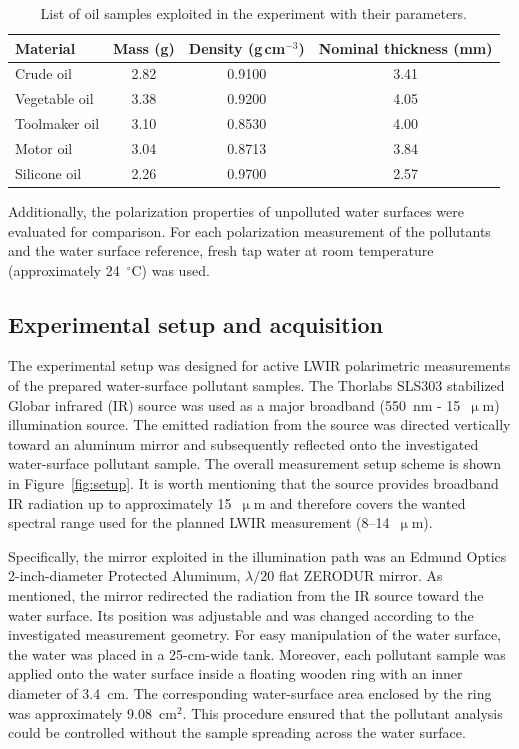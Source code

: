 \documentclass[pdflatex,sn-apa]{sn-jnl}
\begin{document}
\begin{table}[t]
\centering
\caption{List of oil samples exploited in the experiment with their parameters.}
\label{tab:oil_samples}
\begin{tabular}{lccc}
\toprule
Material & Mass (g) & Density (g\,cm$^{-3}$) & Nominal thickness (mm) \\
\midrule
Crude oil     & 2.82 & 0.9100 & 3.41 \\
Vegetable oil & 3.38 & 0.9200 & 4.05 \\
Toolmaker oil & 3.10 & 0.8530 & 4.00 \\
Motor oil     & 3.04 & 0.8713 & 3.84 \\
Silicone oil  & 2.26 & 0.9700 & 2.57 \\
\bottomrule
\end{tabular}
\end{table}

Additionally, the polarization properties of unpolluted water surfaces were evaluated for comparison. For each polarization measurement of the pollutants and the water surface reference, fresh tap water at room temperature (approximately 24~$^\circ$C) was used. 




\subsection{Experimental setup and acquisition}

The experimental setup was designed for active LWIR polarimetric measurements of the prepared water-surface pollutant samples. The Thorlabs SLS303 stabilized Globar infrared (IR) source was used as a major broadband (550~nm - 15~$\upmu$m) illumination source. The emitted radiation from the source was directed vertically toward an aluminum mirror and subsequently reflected onto the investigated water-surface pollutant sample. The overall measurement setup scheme is shown in Figure~\ref{fig:setup}. It is worth mentioning that the source provides broadband IR radiation up to approximately 15~$\upmu$m and therefore covers the wanted spectral range used for the planned LWIR measurement (8--14~$\upmu$m).

Specifically, the mirror exploited in the illumination path was an Edmund Optics 2-inch-diameter Protected Aluminum, $\lambda/20$ flat ZERODUR mirror. As mentioned, the mirror redirected the radiation from the IR source toward the water surface. Its position was adjustable and was changed according to the investigated measurement geometry. For easy manipulation of the water surface, the water was placed in a 25-cm-wide tank. Moreover, each pollutant sample was applied onto the water surface inside a floating wooden ring with an inner diameter of 3.4~cm. The corresponding water-surface area enclosed by the ring was approximately 9.08~cm$^2$. This procedure ensured that the pollutant analysis could be controlled without the sample spreading across the water surface.
\end{document}

